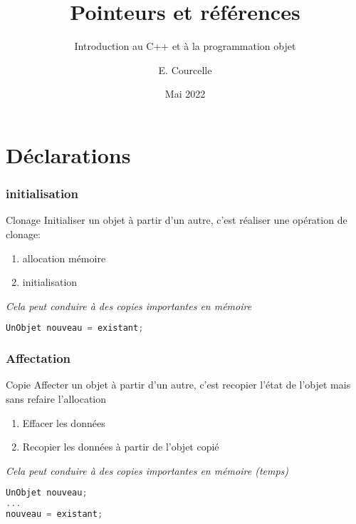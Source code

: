 \documentclass{beamer}
\title{Pointeurs et références}
\subtitle{Introduction au C++ et à la programmation objet}
\author{E. Courcelle}\institute{CALMIP, URA 3669}
\date{Mai 2022}
\begin{document}
\begin{frame}
\titlepage
\end{frame}

\begin{frame}
\tableofcontents
\end{frame}

\section{Déclarations}

\begin{frame}[fragile=singleslide,shrink=20]
\frametitle {initialisation}

\begin{block}{Clonage}
Initialiser un objet à partir d'un autre, c'est réaliser une opération de clonage:
\begin{enumerate}
\item allocation mémoire
\item initialisation
\end{enumerate}
\em Cela peut conduire à des copies importantes en mémoire
\end{block}

\begin{lstlisting}[language=c++]
UnObjet nouveau = existant;
\end{lstlisting}
\end{frame}

\begin{frame}[fragile=singleslide,shrink=20]
\frametitle {Affectation}

\begin{block}{Copie}
Affecter un objet à partir d'un autre, c'est recopier l'état de l'objet mais sans refaire l'allocation
\begin{enumerate}
\item Effacer les données
\item Recopier les données à partir de l'objet copié
\end{enumerate}
\em Cela peut conduire à des copies importantes en mémoire (temps)
\end{block}

\begin{lstlisting}[language=c++]
UnObjet nouveau;
...
nouveau = existant;
\end{lstlisting}
\end{frame}
\end{document}
